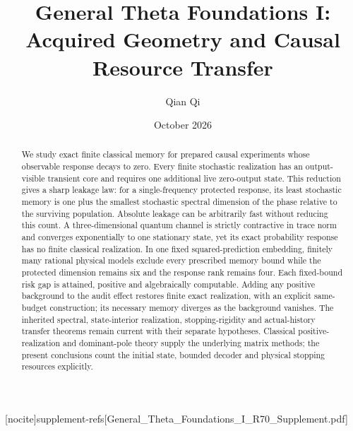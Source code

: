 
[nocite]{supplement-refs}[General_Theta_Foundations_I_R70_Supplement.pdf]
\title[Acquired geometry and causal resource transfer]{General Theta Foundations I:\\Acquired Geometry and Causal Resource Transfer}
\author{Qian Qi}\date{October 2026}

\begin{abstract}
We study exact finite classical memory for prepared causal experiments whose observable response decays to zero. Every finite stochastic realization has an output-visible transient core and requires one additional live zero-output state. This reduction gives a sharp leakage law: for a single-frequency protected response, its least stochastic memory is one plus the smallest stochastic spectral dimension of the phase relative to the surviving population. Absolute leakage can be arbitrarily fast without reducing this count. A three-dimensional quantum channel is strictly contractive in trace norm and converges exponentially to one stationary state, yet its exact probability response has no finite classical realization. In one fixed squared-prediction embedding, finitely many rational physical models exclude every prescribed memory bound while the protected dimension remains six and the response rank remains four. Each fixed-bound risk gap is attained, positive and algebraically computable. Adding any positive background to the audit effect restores finite exact realization, with an explicit same-budget construction; its necessary memory diverges as the background vanishes. The inherited spectral, state-interior realization, stopping-rigidity and actual-history transfer theorems remain current with their separate hypotheses. Classical positive-realization and dominant-pole theory supply the underlying matrix methods; the present conclusions count the initial state, bounded decoder and physical stopping resources explicitly.
\end{abstract}
\maketitle









